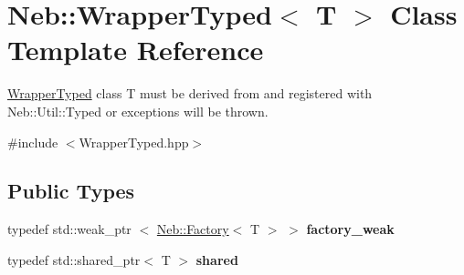 \hypertarget{classNeb_1_1WrapperTyped}{\section{\-Neb\-:\-:\-Wrapper\-Typed$<$ \-T $>$ \-Class \-Template \-Reference}
\label{classNeb_1_1WrapperTyped}
}


\hyperlink{classNeb_1_1WrapperTyped}{\-Wrapper\-Typed} class \-T must be derived from and registered with \-Neb\-::\-Util\-::\-Typed or exceptions will be thrown.  




{\ttfamily \#include $<$\-Wrapper\-Typed.\-hpp$>$}

\subsection*{\-Public \-Types}
\begin{DoxyCompactItemize}
\item 
\hypertarget{classNeb_1_1WrapperTyped_a5aa27220e225486790dc20ba7ec748fb}{typedef std\-::weak\-\_\-ptr\*
$<$ \hyperlink{classNeb_1_1Factory}{\-Neb\-::\-Factory}$<$ \-T $>$ $>$ {\bfseries factory\-\_\-weak}}\label{classNeb_1_1WrapperTyped_a5aa27220e225486790dc20ba7ec748fb}

\item 
\hypertarget{classNeb_1_1WrapperTyped_a3467a3d9954e2176508f0913fb28bc43}{typedef std\-::shared\-\_\-ptr$<$ \-T $>$ {\bfseries shared}}\label{classNeb_1_1WrapperTyped_a3467a3d9954e2176508f0913fb28bc43}

\end{DoxyCompactItemize}
